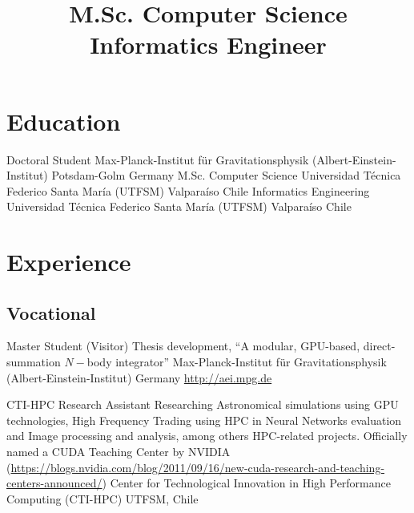 \documentclass[12pt,a4paper]{moderncv}
\title{\Large M.Sc. Computer Science\newline
Informatics Engineer}
\newcommand{\utfsm}{Universidad Técnica Federico Santa María (UTFSM)}
\newcommand{\gray}{\textcolor{gray}}
\newcommand{\myurl}[1]{\gray{\url{#1}}}
\newcommand{\aei}{Max-Planck-Institut für Gravitationsphysik (Albert-Einstein-Institut)}
\newcommand{\cc}{\textcolor{color1}}
\begin{document}
\maketitle

\vspace{-1cm}
\section{\LARGE Education}

\cventry{\cc{\textbf{2013 to\\ present}}}
        {Doctoral Student}
        {\aei}
        {}
        {Potsdam-Golm}
        {Germany}
        {M.Sc. Computer Science}
        {{\utfsm}}
        {}
        {Valparaíso}
        {Chile}
        {Informatics Engineering}
        {{\utfsm}}
        {}
        {Valparaíso}
        {Chile}


\section{\LARGE Experience}
\subsection{\Large Vocational}
\vspace{0.3cm}

        {Master Student (Visitor)}
        {Thesis development, %
        ``A modular, GPU-based, direct-summation $N-$body integrator'' }
        {\aei}
        {Germany}
        {\myurl{http://aei.mpg.de}}

        {CTI-HPC Research Assistant}
        {Researching %
         Astronomical simulations using GPU technologies, %
         High Frequency Trading using HPC in Neural Networks evaluation %
         and Image processing and analysis, among others HPC-related projects.
         Officially named a CUDA Teaching Center by NVIDIA
         (\myurl{https://blogs.nvidia.com/blog/2011/09/16/new-cuda-research-and-teaching-centers-announced/})
         }
        {Center for Technological Innovation in High Performance Computing (CTI-HPC)}
        {UTFSM, Chile}
        {}
\end{document}
